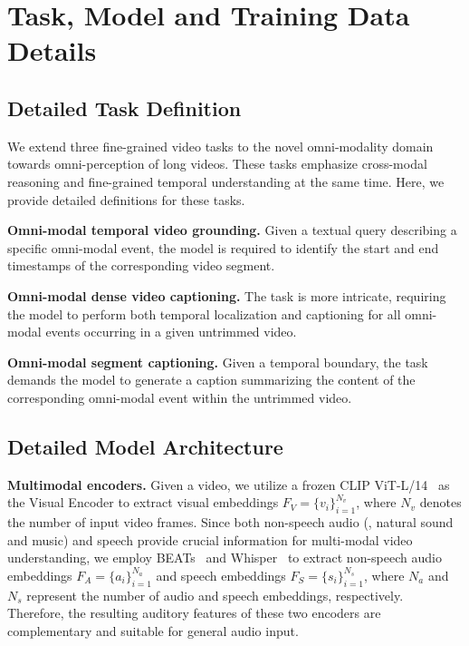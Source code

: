 \section{Task, Model and Training Data Details}
\subsection{Detailed Task Definition}
We extend three fine-grained video tasks to the novel omni-modality domain towards omni-perception of long videos.
These tasks emphasize cross-modal reasoning and fine-grained temporal understanding at the same time. Here, we provide detailed definitions for these tasks.

\noindent\textbf{Omni-modal temporal video grounding.} Given a textual query describing a specific omni-modal event, the model is required to identify the start and end timestamps of the corresponding video segment.

\noindent\textbf{Omni-modal dense video captioning.} The task is more intricate, requiring the model to perform both temporal localization and captioning for all omni-modal events occurring in a given untrimmed video.

\noindent\textbf{Omni-modal segment captioning.} Given a temporal boundary, the task demands the model to generate a caption summarizing the content of the corresponding omni-modal event within the untrimmed video.

\subsection{Detailed Model Architecture}
\noindent\textbf{Multimodal encoders.} Given a video, we utilize a frozen CLIP ViT-L/14~\cite{radford2021learning} as the Visual Encoder to extract visual embeddings $F_{V}=\{v_{i}\}^{N_{v}}_{i=1}$, where $N_{v}$ denotes the number of input video frames. 
Since both non-speech audio (\ie, natural sound and music) and speech provide crucial information for multi-modal video understanding, we employ BEATs~\cite{chen2022beats} and Whisper~\cite{radford2023robust} to extract non-speech audio embeddings $F_{A}=\{a_{i}\}_{i=1}^{N_{a}}$ and speech embeddings $F_{S}=\{s_{i}\}_{i=1}^{N_{s}}$, where $N_{a}$ and $N_{s}$ represent the number of audio and speech embeddings, respectively.
Therefore, the resulting auditory features of these two encoders are complementary and suitable for general audio input.


